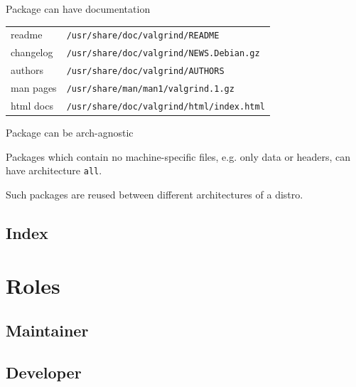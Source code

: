 \documentclass{beamer}
\begin{document}
\begin{frame}[fragile]{Package can have documentation}
    \begin{block}{}
        \renewcommand{\arraystretch}{1.5}
        \begin{tabular}{l l}
            readme & \small\verb|/usr/share/doc/valgrind/README| \\
            changelog & \small\verb|/usr/share/doc/valgrind/NEWS.Debian.gz| \\
            authors & \small\verb|/usr/share/doc/valgrind/AUTHORS| \\
            man pages & \small\verb|/usr/share/man/man1/valgrind.1.gz| \\
            html docs & \small\verb|/usr/share/doc/valgrind/html/index.html| \\
        \end{tabular}
    \end{block}
\end{frame}

\begin{frame}[fragile]{Package can be arch-agnostic}
    \begin{block}{}
        Packages which contain no machine-specific files,
        e.g. only data or headers, can have architecture \verb|all|.
    \end{block}
    \begin{block}{}
        Such packages are reused
        between different architectures of a distro.
    \end{block}
\end{frame}

\subsection{Index}

\begin{frame}
\end{frame}

\section{Roles}

\subsection{Maintainer}

\begin{frame}
\end{frame}

\subsection{Developer}

\begin{frame}
\end{frame}
\end{document}
